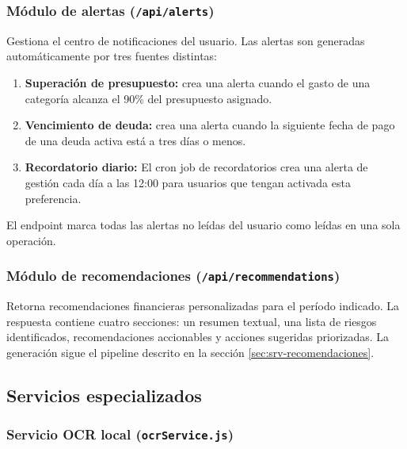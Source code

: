 \subsubsection{Módulo de alertas (\texttt{/api/alerts})}

Gestiona el centro de notificaciones del usuario. Las alertas son
generadas automáticamente por tres fuentes distintas:

\begin{enumerate}
  \item \textbf{Superación de presupuesto:} 
    crea una alerta cuando el gasto de una categoría alcanza el 90\%
    del presupuesto asignado.
  \item \textbf{Vencimiento de deuda:}  crea
    una alerta cuando la siguiente fecha de pago de una deuda activa
    está a tres días o menos.
  \item \textbf{Recordatorio diario:} El cron job de recordatorios
    crea una alerta de gestión cada día a las 12:00 para usuarios que
    tengan activada esta preferencia.
\end{enumerate}

El endpoint  marca todas las alertas
no leídas del usuario como leídas en una sola operación.

\subsubsection{Módulo de recomendaciones (\texttt{/api/recommendations})}

Retorna recomendaciones financieras personalizadas para el período
indicado. La respuesta contiene cuatro secciones: un resumen textual,
una lista de riesgos identificados, recomendaciones accionables y
acciones sugeridas priorizadas. La generación sigue el pipeline
descrito en la sección \ref{sec:srv-recomendaciones}.

\subsection{Servicios especializados}

\subsubsection{Servicio OCR local (\texttt{ocrService.js})}

